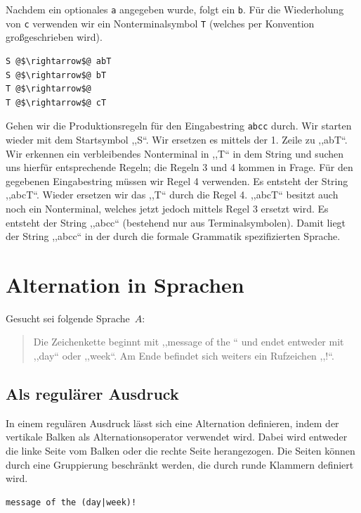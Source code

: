 Nachdem ein optionales \texttt{a} angegeben wurde, folgt ein \texttt{b}. Für die Wiederholung von \texttt{c} verwenden wir ein Nonterminalsymbol \texttt{T} (welches per Konvention großgeschrieben wird).
\begin{lstlisting}
S @$\rightarrow$@ abT
S @$\rightarrow$@ bT
T @$\rightarrow$@
T @$\rightarrow$@ cT
\end{lstlisting}

Gehen wir die Produktionsregeln für den Eingabestring \texttt{abcc} durch. Wir starten wieder mit dem Startsymbol ,,S``. Wir ersetzen es mittels der 1. Zeile zu ,,abT``. Wir erkennen ein verbleibendes Nonterminal in ,,T`` in dem String und suchen uns hierfür entsprechende Regeln; die Regeln 3 und 4 kommen in Frage. Für den gegebenen Eingabestring müssen wir Regel 4 verwenden. Es entsteht der String ,,abcT``. Wieder ersetzen wir das ,,T`` durch die Regel 4. ,,abcT`` besitzt auch noch ein Nonterminal, welches jetzt jedoch mittels Regel 3 ersetzt wird. Es entsteht der String ,,abcc`` (bestehend nur aus Terminalsymbolen). Damit liegt der String ,,abcc`` in der durch die formale Grammatik spezifizierten Sprache.

\section{Alternation in Sprachen}
%
Gesucht sei folgende Sprache~$A$:
\begin{quote}
  Die Zeichenkette beginnt mit ,,message of the `` und endet entweder mit ,,day`` oder ,,week``. Am Ende befindet sich weiters ein Rufzeichen ,,{!}``.
\end{quote}

\subsection{Als regulärer Ausdruck}
%
In einem regulären Ausdruck lässt sich eine Alternation definieren, indem der vertikale Balken als Alternationsoperator verwendet wird. Dabei wird entweder die linke Seite vom Balken oder die rechte Seite herangezogen. Die Seiten können durch eine Gruppierung beschränkt werden, die durch runde Klammern definiert wird.

\begin{lstlisting}
message of the (day|week)!
\end{lstlisting}


